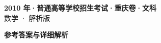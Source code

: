 \documentclass[zihao=-4, a4paper]{ctexart}
\begin{document}
\begin{center}
  {\Large\bfseries 2010 年·普通高等学校招生考试·重庆卷·文科}\\[4pt]
  {\large 数学 · 解析版}
\end{center}
\medskip
{}

\clearpage
{}
\begin{center}{\Large\bfseries 参考答案与详细解析}\end{center}
\medskip

\end{document}
